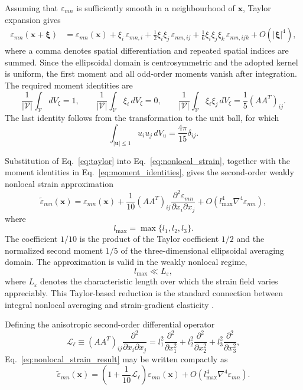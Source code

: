 \documentclass[final,3p,times,fleqn]{elsarticle}
\begin{document}
Assuming that $\varepsilon_{mn}$ is sufficiently smooth in a
neighbourhood of $\mathbf{x}$, Taylor expansion gives
\begin{align}\label{eq:taylor}
\varepsilon_{mn}(\mathbf{x}+\boldsymbol{\xi})
&=
\varepsilon_{mn}(\mathbf{x})
+
\xi_i\,\varepsilon_{mn,i}
+
\frac{1}{2}\xi_i\xi_j\,\varepsilon_{mn,ij}
+
\frac{1}{6}\xi_i\xi_j\xi_k\,\varepsilon_{mn,ijk}
+
O(|\boldsymbol{\xi}|^4),
\end{align}
where a comma denotes spatial differentiation and repeated spatial
indices are summed. Since the ellipsoidal domain is centrosymmetric and
the adopted kernel is uniform, the first moment and all odd-order
moments vanish after integration. The required moment identities are
\begin{equation}\label{eq:moment_identities}
  \frac{1}{|\mathcal{V}|}
  \int_{\mathcal{V}}dV_{\xi}=1,
  \qquad
  \frac{1}{|\mathcal{V}|}
  \int_{\mathcal{V}}\xi_i\,dV_{\xi}=0,
  \qquad
  \frac{1}{|\mathcal{V}|}
  \int_{\mathcal{V}}\xi_i\xi_j\,dV_{\xi}
  =
  \frac{1}{5}(AA^T)_{ij}.
\end{equation}
The last identity follows from the transformation to the unit ball,
for which
\[
  \int_{|\mathbf{u}|\leq 1}u_i u_j\,dV_u
  =
  \frac{4\pi}{15}\delta_{ij}.
\]

Substitution of Eq.~\eqref{eq:taylor} into
Eq.~\eqref{eq:nonlocal_strain}, together with the moment identities in
Eq.~\eqref{eq:moment_identities}, gives the second-order weakly
nonlocal strain approximation
\begin{equation}\label{eq:nonlocal_strain_result}
\tilde{\varepsilon}_{mn}(\mathbf{x})
=
\varepsilon_{mn}(\mathbf{x})
+
\frac{1}{10}
(AA^T)_{ij}
\frac{\partial^2\varepsilon_{mn}}
   {\partial x_i\partial x_j}
+
O(l_{\max}^{4}\nabla^{4}\varepsilon_{mn}) ,
\end{equation}
where
\[
  l_{\max}=\max\{l_1,l_2,l_3\}.
\]
The coefficient $1/10$ is the product of the Taylor coefficient $1/2$
and the normalized second moment $1/5$ of the three-dimensional
ellipsoidal averaging domain. The approximation is valid in the weakly
nonlocal regime,
\[
  l_{\max}\ll L_{\varepsilon},
\]
where $L_{\varepsilon}$ denotes the characteristic length over which the
strain field varies appreciably. This Taylor-based reduction is the
standard connection between integral nonlocal averaging and
strain-gradient elasticity
\cite{Aifantis1992,AskesAifantis2011}.

Defining the anisotropic second-order differential operator
\begin{equation}\label{eq:Lop}
\mathcal{L}_{\ell}
\equiv
(AA^T)_{ij}
\frac{\partial^2}{\partial x_i\partial x_j}
=
l_1^2\frac{\partial^2}{\partial x_1^2}
+
l_2^2\frac{\partial^2}{\partial x_2^2}
+
l_3^2\frac{\partial^2}{\partial x_3^2},
\end{equation}
Eq.~\eqref{eq:nonlocal_strain_result} may be written compactly as
\begin{equation}\label{eq:nonlocal_strain_compact}
\tilde{\varepsilon}_{mn}(\mathbf{x})
=
\left(
1+\frac{1}{10}\mathcal{L}_{\ell}
\right)
\varepsilon_{mn}(\mathbf{x})
+
O(l_{\max}^{4}\nabla^{4}\varepsilon_{mn}) .
\end{equation}
\end{document}

